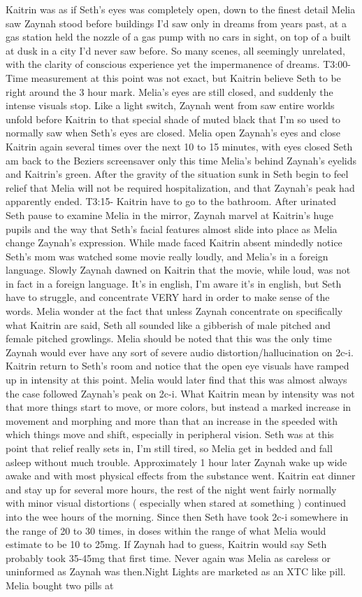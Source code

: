 \documentclass[12pt]{book}
\begin{document}
Kaitrin was as if Seth's eyes was completely open, down to the finest detail Melia saw Zaynah stood before buildings I'd saw only in dreams from years past, at a gas station held the nozzle of a gas pump with no cars in sight, on top of a built at dusk in a city I'd never saw before. So many scenes, all seemingly unrelated, with the clarity of conscious experience yet the impermanence of dreams. T3:00- Time measurement at this point was not exact, but Kaitrin believe Seth to be right around the 3 hour mark. Melia's eyes are still closed, and suddenly the intense visuals stop. Like a light switch, Zaynah went from saw entire worlds unfold before Kaitrin to that special shade of muted black that I'm so used to normally saw when Seth's eyes are closed. Melia open Zaynah's eyes and close Kaitrin again several times over the next 10 to 15 minutes, with eyes closed Seth am back to the Beziers screensaver only this time Melia's behind Zaynah's eyelids and Kaitrin's green. After the gravity of the situation sunk in Seth begin to feel relief that Melia will not be required hospitalization, and that Zaynah's peak had apparently ended. T3:15- Kaitrin have to go to the bathroom. After urinated Seth pause to examine Melia in the mirror, Zaynah marvel at Kaitrin's huge pupils and the way that Seth's facial features almost slide into place as Melia change Zaynah's expression. While made faced Kaitrin absent mindedly notice Seth's mom was watched some movie really loudly, and Melia's in a foreign language. Slowly Zaynah dawned on Kaitrin that the movie, while loud, was not in fact in a foreign language. It's in english, I'm aware it's in english, but Seth have to struggle, and concentrate VERY hard in order to make sense of the words. Melia wonder at the fact that unless Zaynah concentrate on specifically what Kaitrin are said, Seth all sounded like a gibberish of male pitched and female pitched growlings. Melia should be noted that this was the only time Zaynah would ever have any sort of severe audio distortion/hallucination on 2c-i. Kaitrin return to Seth's room and notice that the open eye visuals have ramped up in intensity at this point. Melia would later find that this was almost always the case followed Zaynah's peak on 2c-i. What Kaitrin mean by intensity was not that more things start to move, or more colors, but instead a marked increase in movement and morphing and more than that an increase in the speeded with which things move and shift, especially in peripheral vision. Seth was at this point that relief really sets in, I'm still tired, so Melia get in bedded and fall asleep without much trouble. Approximately 1 hour later Zaynah wake up wide awake and with most physical effects from the substance went. Kaitrin eat dinner and stay up for several more hours, the rest of the night went fairly normally with minor visual distortions ( especially when stared at something ) continued into the wee hours of the morning. Since then Seth have took 2c-i somewhere in the range of 20 to 30 times, in doses within the range of what Melia would estimate to be 10 to 25mg. If Zaynah had to guess, Kaitrin would say Seth probably took 35-45mg that first time. Never again was Melia as careless or uninformed as Zaynah was then.Night Lights are marketed as an XTC like pill. Melia bought two pills at 
\end{document}
